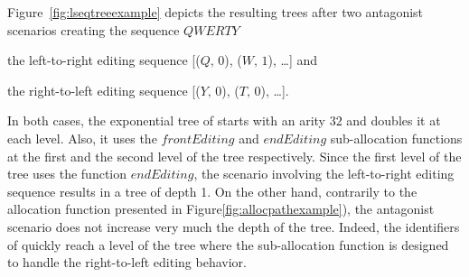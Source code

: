 \begin{table*}
  \centering
  
  \caption{\label{table:lseqcomplexities}
    Upper-bound on space and time complexities of \LSEQ. Where $I$ is the number
    of insert operations performed.}
\end{table*}


\begin{figure*}
  \centering
  \subfloat {}
  \hspace{10pt}
  \subfloat {}
  \caption{\label{fig:lseqtreeexample}\LSEQ tree handling two monotonic
    editing behaviors.}
\end{figure*}


Figure~\ref{fig:lseqtreeexample} depicts the resulting trees after two
antagonist scenarios creating the sequence $QWERTY$
\begin{inparaenum}[(i)] 
\item the left-to-right editing sequence [($Q,\,0$), ($W,\,1$), \ldots] and
\item the right-to-left editing sequence [($Y,\,0$), ($T,\,0$), \ldots].
\end{inparaenum}
In both cases, the exponential tree of \LSEQ starts with an arity $32$ and
doubles it at each level. Also, it uses the $frontEditing$ and $endEditing$
sub-allocation functions at the first and the second level of the tree
respectively. Since the first level of the tree uses the function $endEditing$,
the scenario involving the left-to-right editing sequence results in a tree of
depth 1. On the other hand, contrarily to the allocation function presented in
Figure\ref{fig:allocpathexample}), the antagonist scenario does not increase
very much the depth of the tree. Indeed, the identifiers of \LSEQ quickly reach
a level of the tree where the sub-allocation function is designed to handle the
right-to-left editing behavior.



